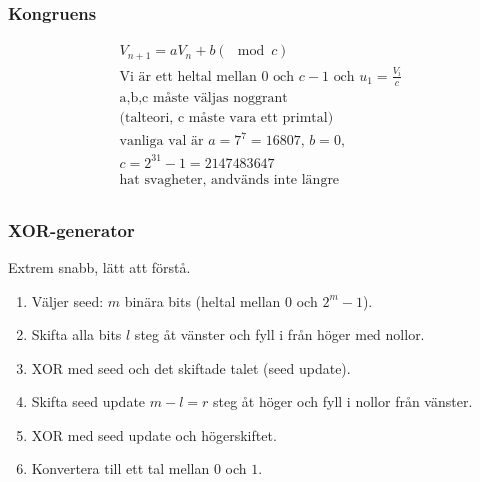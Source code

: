 \begin{multicols}{2}
\subsubsection{Kongruens}
\begin{align*}
  &V_{n+1}=aV_n+b (\mod c) \\
  &\text{Vi är ett heltal mellan $0$ och $c-1$ och $u_1=\frac{V_i}{c}$ }\\
  &\text{a,b,c måste väljas noggrant} \\ 
  &\text{(talteori, c måste vara ett primtal)} \\
  &\text{vanliga val är } a=7^7=16807, \, b=0, \, \\
  &c=2^{31}-1= 2 147 483 647 \\
  &\text{hat svagheter, andvänds inte längre} \\
\end{align*}

\subsubsection{XOR-generator}
Extrem snabb, lätt att förstå.
\begin{enumerate}
  \item Väljer seed: $m$ binära bits (heltal mellan $0$ och $2^m-1$).
  \item Skifta alla bits $l$ steg åt vänster och fyll i från höger med nollor.
  \item XOR med seed och det skiftade talet (seed update).
  \item Skifta seed update $m-l=r$ steg åt höger och fyll i nollor från vänster.
  \item XOR med seed update och högerskiftet.
  \item Konvertera till ett tal mellan $0$ och $1$.
\end{enumerate}


\end{multicols}
